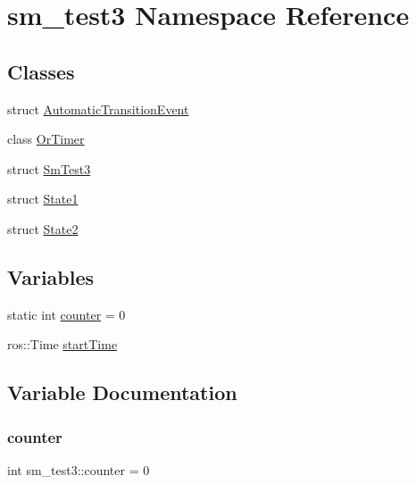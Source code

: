 \hypertarget{namespacesm__test3}{}\section{sm\+\_\+test3 Namespace Reference}
\label{namespacesm__test3}
\subsection*{Classes}
\begin{DoxyCompactItemize}
\item 
struct \hyperlink{structsm__test3_1_1AutomaticTransitionEvent}{Automatic\+Transition\+Event}
\item 
class \hyperlink{classsm__test3_1_1OrTimer}{Or\+Timer}
\item 
struct \hyperlink{structsm__test3_1_1SmTest3}{Sm\+Test3}
\item 
struct \hyperlink{structsm__test3_1_1State1}{State1}
\item 
struct \hyperlink{structsm__test3_1_1State2}{State2}
\end{DoxyCompactItemize}
\subsection*{Variables}
\begin{DoxyCompactItemize}
\item 
static int \hyperlink{namespacesm__test3_ab58afc60ebc0becda5535ba21c5a310a}{counter} = 0
\item 
ros\+::\+Time \hyperlink{namespacesm__test3_a3c530a2f1d2f50afbd4e56e96c1edd83}{start\+Time}
\end{DoxyCompactItemize}


\subsection{Variable Documentation}
\mbox{\label{namespacesm__test3_ab58afc60ebc0becda5535ba21c5a310a}} 
\subsubsection{\texorpdfstring{counter}{counter}}
{\footnotesize\ttfamily int sm\+\_\+test3\+::counter = 0\hspace{0.3cm}{\ttfamily [static]}}




